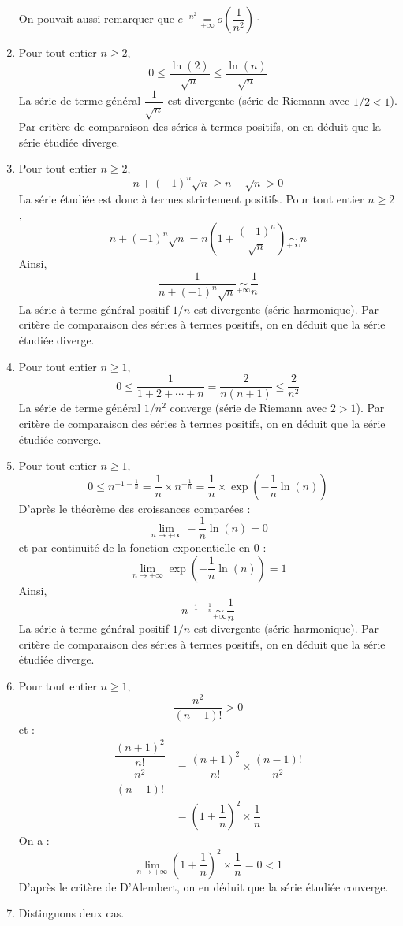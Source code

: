 \documentclass[a4paper,10pt]{report}
\begin{document}
\begin{enumerate}
\noindent On pouvait aussi remarquer que $e^{-n^2} \underset{+ \infty}{=} o \left( \dfrac{1}{n^2} \right) \cdot$
\item Pour tout entier $n \geq 2$,
$$ 0 \leq \dfrac{\ln(2)}{\sqrt{n}} \leq \dfrac{\ln(n)}{\sqrt{n}}$$
La série de terme général $\dfrac{1}{\sqrt{n}}$ est divergente (série de Riemann avec $1/2<1$). Par critère de comparaison des séries à termes positifs, on en déduit que la série étudiée diverge.
\item Pour tout entier $n \geq 2$,
$$ n+(-1)^n \sqrt{n} \geq n- \sqrt{n} >0$$
La série étudiée est donc à termes strictement positifs. Pour tout entier $n \geq 2$,
$$ n+(-1)^n \sqrt{n} = n \left( 1 + \dfrac{(-1)^n}{\sqrt{n}} \right) \underset{+ \infty}{\sim} n$$
Ainsi,
$$ \dfrac{1}{n+(-1)^n \sqrt{n}} \underset{+ \infty}{\sim} \dfrac{1}{n}$$
La série à terme général positif $1/n$ est divergente (série harmonique). Par critère de comparaison des séries à termes positifs, on en déduit que la série étudiée diverge.
\item Pour tout entier $n \geq 1$,
$$ 0 \leq \dfrac{1}{1+2+ \cdots + n}  = \dfrac{2}{n(n+1)} \leq \dfrac{2}{n^2}$$
La série de terme général $1/n^2$ converge (série de Riemann avec $2>1$). Par critère de comparaison des séries à termes positifs, on en déduit que la série étudiée converge.
\item Pour tout entier $n \geq 1$,
$$ 0 \leq n^{-1- \frac{1}{n}} = \dfrac{1}{n} \times n^{- \frac{1}{n}} = \dfrac{1}{n} \times \exp \left( - \dfrac{1}{n} \ln(n) \right)$$
D'après le théorème des croissances comparées :
$$ \lim_{n \rightarrow + \infty}  - \dfrac{1}{n} \ln(n) = 0$$
et par continuité de la fonction exponentielle en $0$ :
$$ \lim_{n \rightarrow + \infty}  \exp \left( - \dfrac{1}{n} \ln(n) \right) = 1$$
Ainsi,
$$ n^{-1- \frac{1}{n}}  \underset{+ \infty}{\sim} \dfrac{1}{n}$$
La série à terme général positif $1/n$ est divergente (série harmonique). Par critère de comparaison des séries à termes positifs, on en déduit que la série étudiée diverge.
\item Pour tout entier $n \geq 1$,
$$  \dfrac{n^2}{(n-1)!} >0$$
et :
\begin{align*}
\dfrac{ \dfrac{(n+1)^2}{n!}}{ \dfrac{n^2}{(n-1)!}}  & = \dfrac{(n+1)^2}{n!} \times \dfrac{(n-1)!}{n^2} \\
& = \left(1+ \dfrac{1}{n}\right)^2 \times \dfrac{1}{n}
\end{align*}
On a :
$$ \lim_{n \rightarrow + \infty}  \left(1+ \dfrac{1}{n}\right)^2 \times \dfrac{1}{n} = 0 <1$$
D'après le critère de D'Alembert, on en déduit que la série étudiée converge.
\item Distinguons deux cas.


\end{enumerate}
\end{document}
